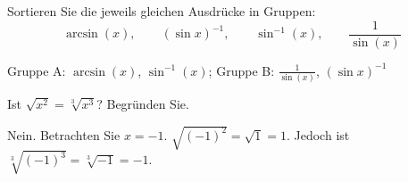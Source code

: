 \begin{exercises}
\begin{exercise}
Sortieren Sie die jeweils gleichen Ausdrücke in Gruppen:
\[
\arcsin(x), \qquad (\sin x)^{-1}, \qquad  \sin^{-1}(x), \qquad \frac{1}{\sin(x)}
\]
\begin{answer}
Gruppe A: $\arcsin(x)$, $\sin^{-1}(x)$;
Gruppe B: $\frac{1}{\sin(x)}$, $(\sin x)^{-1}$
\end{answer}
\end{exercise}

\begin{exercise}
Ist $\sqrt{x^2} = \sqrt[3]{x^3}$? Begründen Sie.
\begin{answer}
Nein. Betrachten Sie $x = -1$. $\sqrt{(-1)^2} = \sqrt{1} = 1$. Jedoch ist $\sqrt[3]{(-1)^3} =  \sqrt[3]{-1} = -1$.
\end{answer}
\end{exercise}



\end{exercises}
